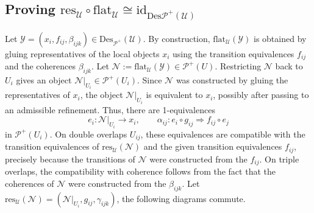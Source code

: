 \documentclass[reqno]{amsart}
\theoremstyle{definition}
\theoremstyle{remark}
\begin{document}
\subsection{Proving $\text{res}_{\mathcal{U}}\circ \text{flat}_{\mathcal{U}}
\cong\text{id}_{\text{Des}{\mathscr{P}^+}(\mathcal{U})}$}
Let $\mathcal{Y}=(x_i,f_{ij},\beta_{ijk})\in\text{Des}_{\mathscr{P}^+}(\mathcal{U})$. By construction, $\text{flat}_{\mathcal{U}}(\mathcal{Y})$ is obtained by gluing representatives of the local objects $x_i$ using the transition equivalences $f_{ij}$ and the coherences $\beta_{ijk}$. Let $\mathcal{N}:=\text{flat}_{\mathcal{U}}(\mathcal{Y})\in \mathscr{P}^+(U)$. Restricting $\mathcal{N}$ back to $U_i$ gives an object $\mathcal{N}|_{U_i}\in \mathscr{P}^+(U_i)$. Since $\mathcal{N}$ was constructed by gluing the representatives of $x_i$, the object $\mathcal{N}|_{U_i}$ is equivalent to $x_i$, possibly after passing to an admissible refinement. Thus, there are 1-equivalences
\begin{equation}
e_i:\mathcal{N}|_{U_i}\longrightarrow x_i, \qquad \alpha_{ij}:e_i\circ g_{ij} \Longrightarrow f_{ij}\circ e_j
\end{equation}
in $\mathscr{P}^+(U_i)$. On double overlaps $U_{ij}$, these equivalences are compatible with the transition equivalences of $\text{res}_{\mathcal{U}}(\mathcal{N})$ and the given transition equivalences $f_{ij}$, precisely because the transitions of $\mathcal{N}$ were constructed from the $f_{ij}$. On triple overlaps, the compatibility with coherence follows from the fact that the coherences of $\mathcal{N}$ were constructed from the $\beta_{ijk}$. Let $\text{res}_\mathcal{U}(\mathcal{N})=\left(\mathcal{N}|_{U_i},g_{ij},\gamma_{ijk}\right)$, the following diagrams commute.
\end{document}
